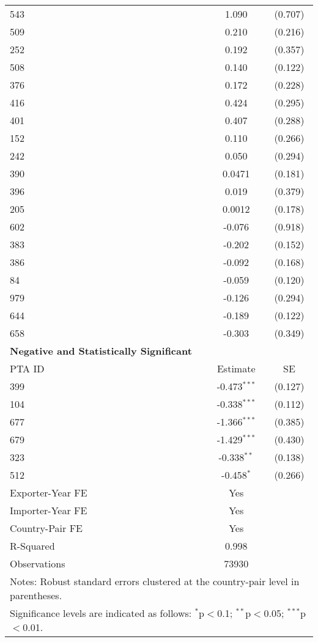 \begin{center}
\begin{longtable}{lcc}
    543 & 1.090 & (0.707) \\
    509 & 0.210 & (0.216) \\
    252 & 0.192 & (0.357) \\
    508 & 0.140 & (0.122) \\
    376 & 0.172 & (0.228) \\
    416 & 0.424 & (0.295) \\
    401 & 0.407 & (0.288) \\
    152 & 0.110 & (0.266) \\
    242 & 0.050 & (0.294) \\
    390 & 0.0471 & (0.181) \\
    396 & 0.019 & (0.379) \\
    205 & 0.0012 & (0.178) \\
    602 & -0.076 & (0.918) \\
    383 & -0.202 & (0.152) \\
    386 & -0.092 & (0.168) \\
    84  & -0.059 & (0.120) \\
    979  & -0.126 & (0.294) \\
    644  & -0.189 & (0.122) \\
    658  & -0.303 & (0.349) \\
    \hline
    \textbf{Negative and Statistically Significant} &  &  \\
    \hline
    PTA ID & Estimate & SE \\
    \hline
    399 & -0.473$^{\ast\ast\ast}$ & (0.127) \\
    104 & -0.338$^{\ast\ast\ast}$ & (0.112) \\
    677 & -1.366$^{\ast\ast\ast}$ & (0.385) \\
    679 & -1.429$^{\ast\ast\ast}$ & (0.430) \\
    323 & -0.338$^{\ast\ast}$ & (0.138) \\
    512 & -0.458$^{\ast}$ & (0.266) \\
    \hline
    Exporter-Year FE & Yes \\
    Importer-Year FE & Yes \\
    Country-Pair FE & Yes \\
    R-Squared & 0.998 \\
    Observations & 73930 \\
    \hline
    \multicolumn{3}{l}{\footnotesize{Notes: Robust standard errors clustered at the country-pair level in parentheses.}} \\
    \multicolumn{3}{l}{\footnotesize{Significance levels are indicated as follows: $^{\ast}$p$<$0.1; $^{\ast\ast}$p$<$0.05; $^{\ast\ast\ast}$p$<$0.01.}} \\
\end{longtable}
\end{center}


